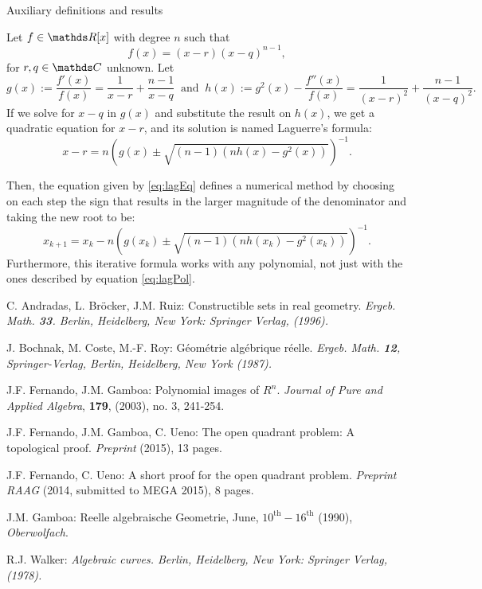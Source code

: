 \documentclass[11pt, a4paper, english, twoside, notitlepage, openright]{report}
\begin{document}
\begin{chapter}{Auxiliary definitions and results}
\begin{proposition}\label{laguerre}
Let $f \in \R[x]$ with degree $n$ such that
\begin{equation}\label{eq:lagPol}
	f(x) = (x - r)(x - q)^{n-1},
\end{equation}
for $r, q \in \C$ unknown. Let 
$$
g(x) := \frac{f'(x)}{f(x)} = \frac{1}{x - r} + \frac{n - 1}{x - q} \ \text{ and } \ h(x) := g^2(x) - \frac{f''(x)}{f(x)} = \frac{1}{(x - r)^2} + \frac{n - 1}{(x - q)^2}.
$$
If we solve for $x - q$ in $g(x)$ and substitute the result on $h(x)$, we get a quadratic equation for $x - r$, and its solution is named Laguerre's formula:
\begin{equation}\label{eq:lagEq}
x - r = n \left(g(x) \pm \sqrt{ (n - 1) (n h(x) - g^2(x))} \right)^{-1}.
\end{equation}

Then, the equation given by \ref{eq:lagEq} defines a numerical method by choosing on each step the sign that results in the larger magnitude of the denominator and taking the new root to be:
$$
x_{k+1} = x_k - n \left(g(x_k) \pm \sqrt{ (n - 1) (n h(x_k) - g^2(x_k))} \right)^{-1}.
$$
Furthermore, this iterative formula works with any polynomial, not just with the ones described by equation \ref{eq:lagPol}.
\end{proposition}

\end{chapter}

\begin{thebibliography}{10}

 C. Andradas, L. Br\"ocker, J.M. Ruiz: Constructible 
sets in real geometry. \em Ergeb. Math. \em{\bf 33}. Berlin, Heidelberg, 
New York: Springer Verlag, (1996).

 J. Bochnak, M. Coste, M.-F. Roy: G\'eom\'etrie
alg\'ebrique r\'eelle. \em Ergeb. Math. \em {\bf 12}, Springer-Verlag,
Berlin, Heidelberg, New York (1987).

 J.F. Fernando, J.M. Gamboa: Polynomial images of $R^n$.
\textit{Journal of Pure and Applied Algebra}, {\bf 179}, (2003), no. 3, 241-254.

 J.F. Fernando, J.M. Gamboa, C. Ueno: The open quadrant problem:
A topological proof. \textit{Preprint} (2015), 13 pages.

 J.F. Fernando, C. Ueno: A short proof for the open quadrant problem.
\textit{Preprint RAAG} (2014, submitted to MEGA 2015), 8 pages.

 J.M. Gamboa: Reelle algebraische Geometrie, June,
$10^{\text{th}}-16^{\text{th}}$ (1990), \textit{Oberwolfach}.

 R.J. Walker: \em Algebraic curves. \em Berlin, Heidelberg, 
New York: Springer Verlag, (1978).



\end{thebibliography}
\end{document}
